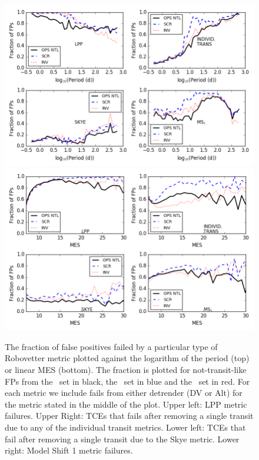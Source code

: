 
\begin{figure}[h!]
    \centering
    \includegraphics[width=0.9\linewidth]{fig-fractionFailsByMetric.png}
    \includegraphics[width=0.9\linewidth]{fig-fractionFailsByMetricMes.png}
    \caption{The fraction of false positives failed by a particular type of Robovetter metric plotted against the logarithm of the period (top) or linear MES (bottom).  The fraction is plotted for not-transit-like FPs from the \opstce\ set in black, the \scrtce\ set in blue and the \invtce\ set in red. For each metric we include fails from either detrender (DV or Alt) for the metric stated in the middle of the plot. Upper left: LPP metric failures. Upper Right: TCEs that fails after removing a single transit due to any of the individual transit metrics.  Lower left: TCEs that fail after removing a single transit due to the Skye metric. Lower right: Model Shift 1 metric failures. }
    \label{f:fractionFailMetric}
\end{figure}

